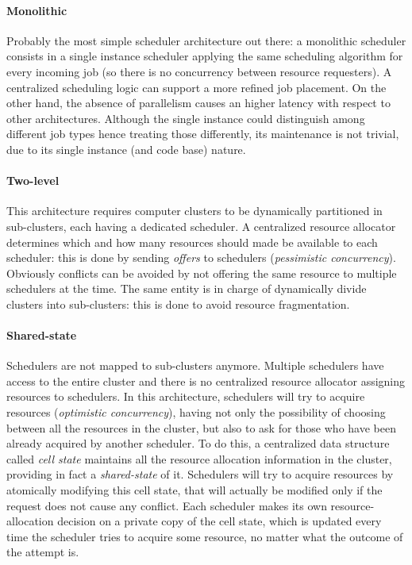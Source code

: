 \paragraph{Monolithic}
Probably the most simple scheduler architecture out there: a monolithic scheduler consists in a single instance scheduler applying the same scheduling algorithm for every incoming job (so there is no concurrency between resource requesters).
A centralized scheduling logic can support a more refined job placement.
On the other hand, the absence of parallelism causes an higher latency with respect to other architectures.
Although the single instance could distinguish among different job types hence treating those differently, its maintenance is not trivial, due to its single instance (and code base) nature.

\paragraph{Two-level}
This architecture requires computer clusters to be dynamically partitioned in sub-clusters, each having a dedicated scheduler.
A centralized resource allocator determines which and how many resources should made be available to each scheduler: this is done by sending \textit{offers} to schedulers (\textit{pessimistic concurrency}).
Obviously conflicts can be avoided by not offering the same resource to multiple schedulers at the time.
The same entity is in charge of dynamically divide clusters into sub-clusters: this is done to avoid resource fragmentation.

\paragraph{Shared-state}
Schedulers are not mapped to sub-clusters anymore.
Multiple schedulers have access to the entire cluster and there is no centralized resource allocator assigning resources to schedulers.
In this architecture, schedulers will try to acquire resources (\textit{optimistic concurrency}), having not only the possibility of choosing between all the resources in the cluster, but also to ask for those who have been already acquired by another scheduler.
To do this, a centralized data structure called \textit{cell state} maintains all the resource allocation information in the cluster, providing in fact a \textit{shared-state} of it.
Schedulers will try to acquire resources by atomically modifying this cell state, that will actually be modified only if the request does not cause any conflict.
Each scheduler makes its own resource-allocation decision on a private copy of the cell state, which is updated every time the scheduler tries to acquire some resource, no matter what the outcome of the attempt is.